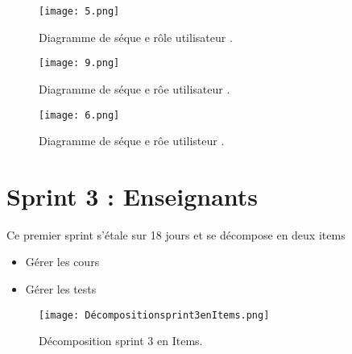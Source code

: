 \begin{figure}[ht]
	\centering
	\texttt{[image: 5.png]}
	\caption{Diagramme de séque e rôle utilisateur .}
	\label{fig:Diagrammde séo rôle utilisateur }
\end{figure}
\FloatBarrier
\begin{figure}[ht]
	\centering
	\texttt{[image: 9.png]}
	\caption{Diagramme de séque e rôe utilisateur .}
	\label{fig:Diagrammde séo rôle utlisateur }
\end{figure}
\FloatBarrier
\begin{figure}[ht]
	\centering
	\texttt{[image: 6.png]}
	\caption{Diagramme de séque e rôe utilisteur .}
	\label{fig:Diagrammde séo rôle utlisater }
\end{figure}
\FloatBarrier
\clearpage

\section{Sprint 3 : Enseignants }
\label{sec:conception}

\begin{fquote}
	Ce premier sprint s’étale sur 18 jours et se décompose en deux items
\end{fquote}
\smallskip
\begin{itemize}[label=$\diamond$]
	\item Gérer les cours 
	
	\item Gérer les  tests
\end{itemize}
\medskip
\medskip
\medskip
\medskip
\medskip
\medskip
\medskip
\medskip
\medskip
\medskip
\medskip
\begin{figure}[ht]
	\centering
	\texttt{[image: Décompositionsprint3enItems.png]}
	\caption{Décomposition sprint 3 en Items.}
	\label{fig:Décomposition srint 3 en Items}
\end{figure}
\FloatBarrier
\clearpage






